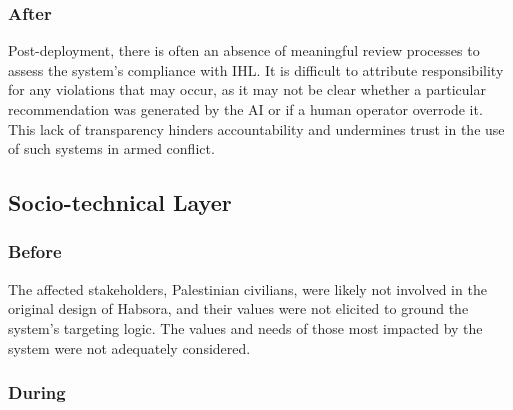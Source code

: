 
\subsubsection{After}

Post-deployment, there is often an absence of meaningful review processes to assess the system's compliance with IHL. It is difficult to attribute responsibility for any violations that may occur, as it may not be clear whether a particular recommendation was generated by the AI or if a human operator overrode it. This lack of transparency hinders accountability and undermines trust in the use of such systems in armed conflict.




\subsection{Socio-technical Layer}


\subsubsection{Before}

The affected stakeholders, Palestinian civilians, were likely not involved in the original design of Habsora, and their values were not elicited to ground the system's targeting logic. The values and needs of those most impacted by the system were not adequately considered.


\subsubsection{During}

